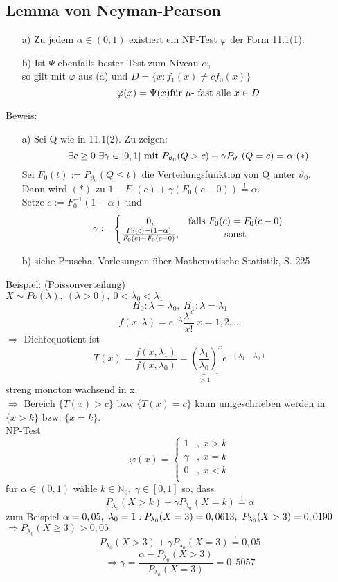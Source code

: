 \documentclass[a4paper,11pt,twoside,titlepage]{article}
\newcommand{\N}{{\mathbb N}}
\begin{document}
\subsection{Lemma von Neyman-Pearson}
\begin{itemize}
\item[a) ]Zu jedem $\alpha\in(0,1)$ existiert ein NP-Test $\varphi$ der Form 11.1(1).
\item[b) ]Ist $\Psi$ ebenfalls bester Test zum Niveau $\alpha$,\\
so gilt mit $\varphi$ aus (a) und $D=\{x:f_1(x)\neq cf_0(x)\}$
$$\varphi(x)=\Psi(x)\textnormal{für }\mu\textnormal{- fast alle }x\in D$$
\end{itemize}
\newpage
\underline{Beweis:}
\begin{itemize}
\item[a) ]Sei Q wie in 11.1(2). Zu zeigen:
$$\exists c\geq 0\ \exists\gamma\in[0,1]\textnormal{ mit }P_{\vartheta_0}(Q>c)+\gamma P_{\vartheta_0}(Q=c)=\alpha\ (\ast)$$
Sei $F_0(t):=P_{\vartheta_0}(Q\leq t)$ die Verteilungsfunktion von Q unter $\vartheta_0$.\\
Dann wird $(\ast)$ zu $1-F_0(c)+\gamma(F_0(c-0))\stackrel{!}{=}\alpha$.\\
Setze $c:=F_0^{-1}(1-\alpha)$ und
$$\gamma:=\left\{\begin{matrix}
0,&\textnormal{falls }F_0(c)=F_0(c-0)\\
\frac{F_0(c)-(1-\alpha)}{F_0(c)-F_0(c-0)},&\textnormal{sonst}\\
\end{matrix}\right.$$
\item[b) ]siehe Pruscha, Vorlesungen über Mathematische Statistik, S. 225
\end{itemize}

\underline{Beispiel:} (Poissonverteilung)\\
$X\sim Po(\lambda),\ (\lambda>0),\ 0<\lambda_0<\lambda_1$
$$H_0:\lambda=\lambda_0,\ H_1: \lambda=\lambda_1$$
$$f(x,\lambda)=e^{-\lambda}\frac{\lambda^x}{x!}\ x=1,2,\ldots$$
$\Rightarrow$ Dichtequotient ist 
$$T(x)=\frac{f(x,\lambda_1)}{f(x,\lambda_0)}={\underbrace{(\frac{\lambda_1}{\lambda_0})}_{>1}}^xe^{-(\lambda_1-\lambda_0)}$$
streng monoton wachsend in x.\\
$\Rightarrow$ Bereich $\{T(x)>c\}$ bzw $\{T(x)=c\}$ kann umgeschrieben werden in $\{x>k\}$ bzw. $\{x=k\}$.\\
NP-Test $$\varphi(x)=\left\{\begin{matrix}
1&,\ x>k\\\gamma&,\ x=k\\0&,\ x<k\\\end{matrix}\right.$$
für $\alpha\in(0,1)$ wähle $k\in\N_0,\ \gamma\in[0,1]$ so, dass
$$P_{\lambda_0}(X>k)+\gamma P_{\lambda_0}(X=k)\stackrel{!}{=}\alpha$$
zum Beispiel $\alpha=0,05,\ \lambda_0=1:\\ P_{\lambda_0}(X=3)=0,0613,\ P_{\lambda_0}(X>3)=0,0190$\\
$\Rightarrow P_{\lambda_0}(X\geq 3)>0,05$
$$P_{\lambda_0}(X>3)+\gamma P_{\lambda_0}(X=3)\stackrel{!}{=}0,05$$
$$\Rightarrow \gamma=\frac{\alpha-P_{\lambda_0}(X>3)}{P_{\lambda_0}(X=3)}=0,5057$$
\end{document}
